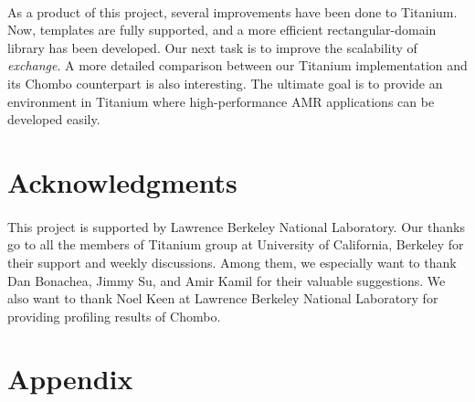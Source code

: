 \documentclass{ieee}
\numberwithin{equation}{section}
\begin{document}

\paragraph{}As a product of this project, several improvements have been done to Titanium. Now, templates are fully supported, and a more efficient  rectangular-domain library has been developed. Our next task  is to improve the scalability of {\it exchange}. A more detailed comparison between our Titanium implementation and its Chombo counterpart is also interesting. The ultimate goal is to provide an environment in Titanium where high-performance AMR applications can be developed easily.

\section*{Acknowledgments}

\paragraph{}This project is supported by Lawrence Berkeley National Laboratory. Our thanks go to all the members of Titanium group at University of California, Berkeley for their support and weekly discussions. Among them,  we especially want to thank Dan Bonachea, Jimmy Su, and Amir Kamil for their valuable suggestions. We also want to thank Noel Keen at  Lawrence Berkeley National Laboratory for providing profiling results of Chombo.

\section*{Appendix}
\end{document}

